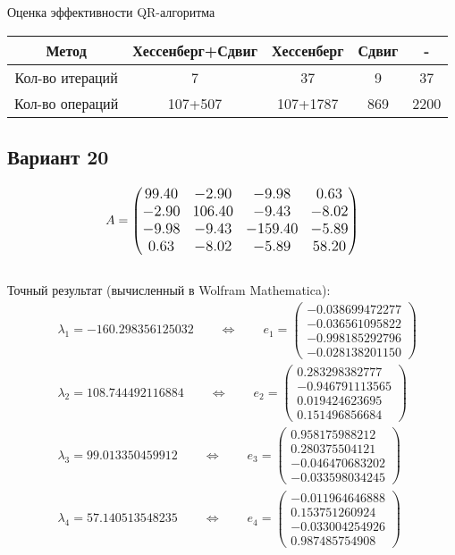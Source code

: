 \documentclass[12pt, a4paper]{article}
\begin{document}
	Оценка эффективности QR-алгоритма
	
	\begin{center}
		\begin{tabular}{|c|c|c|c|c|}
			\hline
			\textbf{Метод}        & \textbf{{Хессенберг+Сдвиг}}&\textbf{{Хессенберг}}&\textbf{{Сдвиг}}&\textbf{{-}} \\ \hline
			Кол-во итераций &7&37&9&37           \\ \hline
			Кол-во операций &107+507&107+1787&869&2200           \\ \hline
		\end{tabular}
	\end{center}
	
	\subsection{Вариант 20}
	\[
	\large
	A = \begin{pmatrix}
		99.40 & -2.90 & -9.98 & 0.63 \\
		-2.90 & 106.40 & -9.43 & -8.02 \\
		-9.98 & -9.43 & -159.40 & -5.89 \\
		0.63 & -8.02 & -5.89 & 58.20
	\end{pmatrix}
	\]
	\\
	Точный результат (вычисленный в Wolfram Mathematica):
	\begin{eqnarray*}
		& \lambda_1 = -160.298356125032 \qquad \Longleftrightarrow \qquad e_1 = \begin{pmatrix}
			-0.038699472277\\-0.036561095822\\-0.998185292796\\-0.028138201150
		\end{pmatrix}\\
		& \lambda_2 =  108.744492116884 \qquad \Longleftrightarrow \qquad e_2 = \begin{pmatrix}
			0.283298382777\\-0.946791113565\\ 0.019424623695\\ 0.151496856684
		\end{pmatrix}\\
		& \lambda_3 =   99.013350459912 \qquad \Longleftrightarrow \qquad e_3 = \begin{pmatrix}
			0.958175988212\\ 0.280375504121\\-0.046470683202\\-0.033598034245
		\end{pmatrix}\\
		& \lambda_4 =   57.140513548235 \qquad \Longleftrightarrow \qquad e_4 = \begin{pmatrix}
			-0.011964646888\\ 0.153751260924\\-0.033004254926\\ 0.987485754908
		\end{pmatrix}
	\end{eqnarray*}
	
\end{document}
